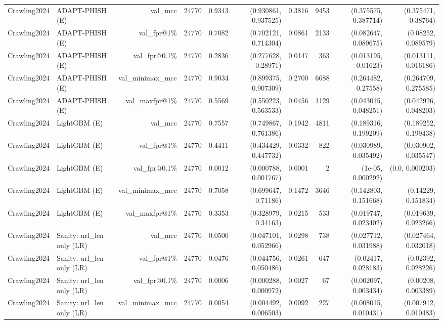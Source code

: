 \begin{table}[t]
\begin{tabular}{llrrrrrrrr}
Crawling2024 & ADAPT-PHISH (E) & val\_mcc & 24770 & 0.9343 & (0.930861, 0.937525) & 0.3816 & 9453 & (0.375575, 0.387714) & (0.375471, 0.38764) \\
Crawling2024 & ADAPT-PHISH (E) & val\_fpr@1\% & 24770 & 0.7082 & (0.702121, 0.714304) & 0.0861 & 2133 & (0.082647, 0.089675) & (0.08252, 0.089579) \\
Crawling2024 & ADAPT-PHISH (E) & val\_fpr@0.1\% & 24770 & 0.2836 & (0.277628, 0.28971) & 0.0147 & 363 & (0.013195, 0.01623) & (0.013111, 0.016186) \\
Crawling2024 & ADAPT-PHISH (E) & val\_minimax\_mcc & 24770 & 0.9034 & (0.899375, 0.907309) & 0.2700 & 6688 & (0.264482, 0.27558) & (0.264709, 0.275585) \\
Crawling2024 & ADAPT-PHISH (E) & val\_maxfpr@1\% & 24770 & 0.5569 & (0.550223, 0.563533) & 0.0456 & 1129 & (0.043015, 0.048251) & (0.042926, 0.048203) \\
Crawling2024 & LightGBM (E) & val\_mcc & 24770 & 0.7557 & (0.749867, 0.761386) & 0.1942 & 4811 & (0.189316, 0.199209) & (0.189252, 0.199438) \\
Crawling2024 & LightGBM (E) & val\_fpr@1\% & 24770 & 0.4411 & (0.434429, 0.447732) & 0.0332 & 822 & (0.030989, 0.035492) & (0.030902, 0.035547) \\
Crawling2024 & LightGBM (E) & val\_fpr@0.1\% & 24770 & 0.0012 & (0.000788, 0.001767) & 0.0001 & 2 & (1e-05, 0.000292) & (0.0, 0.000203) \\
Crawling2024 & LightGBM (E) & val\_minimax\_mcc & 24770 & 0.7058 & (0.699647, 0.71186) & 0.1472 & 3646 & (0.142803, 0.151668) & (0.14229, 0.151834) \\
Crawling2024 & LightGBM (E) & val\_maxfpr@1\% & 24770 & 0.3353 & (0.328979, 0.34163) & 0.0215 & 533 & (0.019747, 0.023402) & (0.019639, 0.023266) \\
Crawling2024 & Sanity: url\_len only (LR) & val\_mcc & 24770 & 0.0500 & (0.047101, 0.052966) & 0.0298 & 738 & (0.027712, 0.031988) & (0.027464, 0.032018) \\
Crawling2024 & Sanity: url\_len only (LR) & val\_fpr@1\% & 24770 & 0.0476 & (0.044756, 0.050486) & 0.0261 & 647 & (0.02417, 0.028183) & (0.02392, 0.028226) \\
Crawling2024 & Sanity: url\_len only (LR) & val\_fpr@0.1\% & 24770 & 0.0006 & (0.000288, 0.000972) & 0.0027 & 67 & (0.002097, 0.003434) & (0.00208, 0.003389) \\
Crawling2024 & Sanity: url\_len only (LR) & val\_minimax\_mcc & 24770 & 0.0054 & (0.004492, 0.006503) & 0.0092 & 227 & (0.008015, 0.010431) & (0.007912, 0.010483) \\

\end{tabular}
\end{table}
